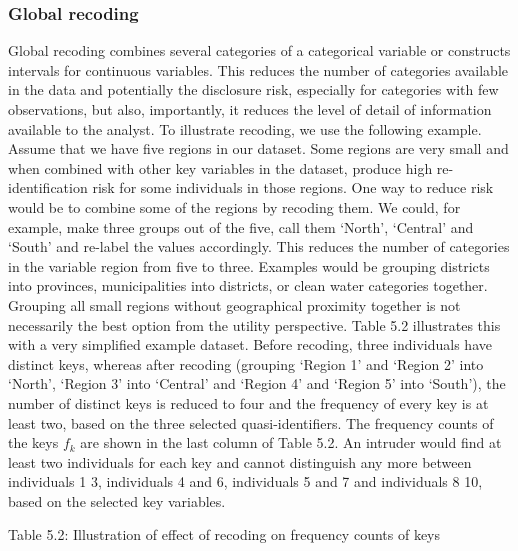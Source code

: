 \documentclass[letterpaper,10pt,english]{sphinxmanual}
\begin{document}
\subsubsection{Global recoding}
\label{\detokenize{anon_methods:global-recoding}}
Global recoding combines several categories of a categorical variable or
constructs intervals for continuous variables. This reduces the number
of categories available in the data and potentially the disclosure risk,
especially for categories with few observations, but also, importantly,
it reduces the level of detail of information available to the analyst.
To illustrate recoding, we use the following example. Assume that we
have five regions in our dataset. Some regions are very small and when
combined with other key variables in the dataset, produce high
re-identification risk for some individuals in those regions. One way to
reduce risk would be to combine some of the regions by recoding them. We
could, for example, make three groups out of the five, call them
‘North’, ‘Central’ and ‘South’ and re-label the values accordingly. This
reduces the number of categories in the variable region from five to
three.  Examples would be grouping districts
into provinces, municipalities into districts, or clean water categories
together. Grouping all small regions without geographical proximity
together is not necessarily the best option from the utility
perspective. Table 5.2 illustrates this with a very simplified example
dataset. Before recoding, three individuals have distinct keys, whereas
after recoding (grouping ‘Region 1’ and ‘Region 2’ into ‘North’, ‘Region
3’ into ‘Central’ and ‘Region 4’ and ‘Region 5’ into ‘South’), the
number of distinct keys is reduced to four and the frequency of every
key is at least two, based on the three selected quasi-identifiers. The
frequency counts of the keys \(f_{k}\) are shown in the last column
of Table 5.2. An intruder would find at least two individuals for each
key and cannot distinguish any more between individuals 1 \textendash{} 3,
individuals 4 and 6, individuals 5 and 7 and individuals 8 \textendash{} 10, based
on the selected key variables.

Table 5.2: Illustration of effect of recoding on frequency counts of
keys
\end{document}
